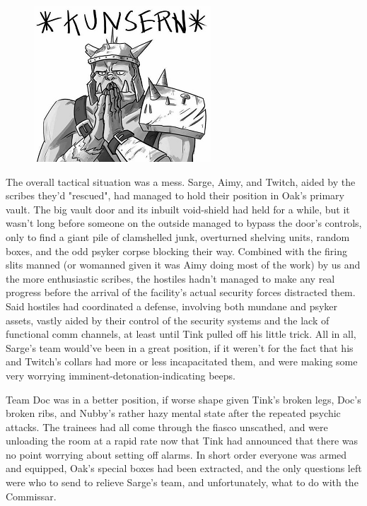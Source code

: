 \begin{figure}
	\begin{center}
		\includegraphics[width=\figwidth]{pics/21/100.png}
	\end{center}
\end{figure}
The overall tactical situation was a mess. 
Sarge, Aimy, and Twitch, aided by the scribes they'd "rescued", had managed to hold their position in Oak's primary vault. 
The big vault door and its inbuilt void-shield had held for a while, but it wasn't long before someone on the outside managed to bypass the door's controls, only to find a giant pile of clamshelled junk, overturned shelving units, random boxes, and the odd psyker corpse blocking their way. 
Combined with the firing slits manned (or womanned given it was Aimy doing most of the work) by us and the more enthusiastic scribes, the hostiles hadn't managed to make any real progress before the arrival of the facility's actual security forces distracted them. 
Said hostiles had coordinated a defense, involving both mundane and psyker assets, vastly aided by their control of the security systems and the lack of functional comm channels, at least until Tink pulled off his little trick. 
All in all, Sarge's team would've been in a great position, if it weren't for the fact that his and Twitch's collars had more or less incapacitated them, and were making some very worrying imminent-detonation-indicating beeps. 


Team Doc was in a better position, if worse shape given Tink's broken legs, Doc's broken ribs, and Nubby's rather hazy mental state after the repeated psychic attacks. 
The trainees had all come through the fiasco unscathed, and were unloading the room at a rapid rate now that Tink had announced that there was no point worrying about setting off alarms. 
In short order everyone was armed and equipped, Oak's special boxes had been extracted, and the only questions left were who to send to relieve Sarge's team, and unfortunately, what to do with the Commissar.

